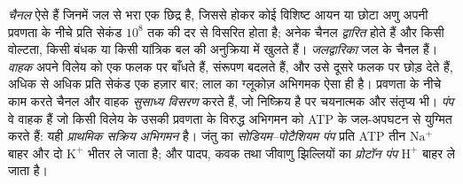 \begin{definition}[चैनल, वाहक, पंप]\label{def:b1:membranes-transport:transporters}
\emph{चैनल} ऐसे  हैं जिनमें जल से भरा एक
छिद्र है, जिससे होकर कोई विशिष्ट आयन या छोटा अणु अपनी प्रवणता के नीचे
प्रति सेकंड $10^8$ तक की दर से विसरित होता है; अनेक चैनल
\emph{द्वारित} होते हैं और किसी वोल्टता, किसी बंधक या किसी यांत्रिक बल
की अनुक्रिया में खुलते हैं। \emph{जलद्वारिका} जल के
चैनल हैं। \emph{वाहक} अपने विलेय को एक फलक पर बाँधते हैं,
संरूपण बदलते हैं, और उसे दूसरे फलक पर छोड़ देते हैं, अधिक से अधिक प्रति
सेकंड एक हज़ार बार; लाल  का ग्लूकोज़ अभिगमक ऐसा ही है। प्रवणता के
नीचे काम करते चैनल और वाहक \emph{सुसाध्य
विसरण} करते हैं, जो निष्क्रिय है पर चयनात्मक और
संतृप्य भी। \emph{पंप} वे वाहक हैं जो किसी विलेय के उसकी
प्रवणता के विरुद्ध अभिगमन को ATP के जल-अपघटन से युग्मित करते हैं: यही
\emph{प्राथमिक सक्रिय अभिगमन} है। जंतु  का
\emph{सोडियम--पोटैशियम पंप} प्रति ATP तीन
$\mathrm{Na^+}$ बाहर और दो $\mathrm{K^+}$ भीतर ले जाता है; और पादप, कवक
तथा जीवाणु झिल्लियों का \emph{प्रोटॉन पंप} $\mathrm{H^+}$ बाहर ले जाता
है।
\end{definition}

